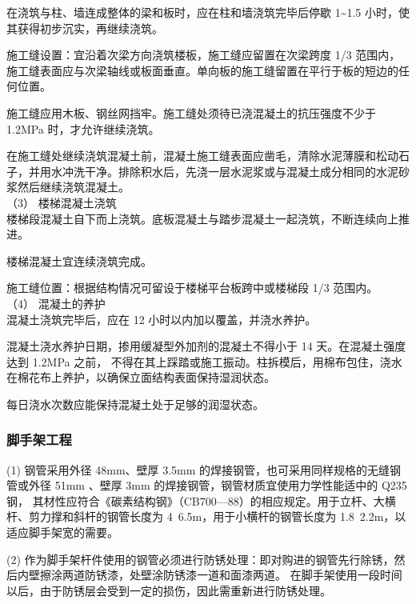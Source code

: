 在浇筑与柱、墙连成整体的梁和板时，应在柱和墙浇筑完毕后停歇 1\textasciitilde1.5 小时，使其获得初步沉实，再继续浇筑。

 施工缝设置：宜沿着次梁方向浇筑楼板，施工缝应留置在次梁跨度 1/3 范围内，施工缝表面应与次梁轴线或板面垂直。单向板的施工缝留置在平行于板的短边的任何位置。

 施工缝应用木板、钢丝网挡牢。施工缝处须待已浇混凝土的抗压强度不少于 1.2MPa 时，才允许继续浇筑。

 在施工缝处继续浇筑混凝土前，混凝土施工缝表面应凿毛，清除水泥薄膜和松动石子，并用水冲洗干净。排除积水后，先浇一层水泥浆或与混凝土成分相同的水泥砂浆然后继续浇筑混凝土。\\

（3） 楼梯混凝土浇筑\\

 楼梯段混凝土自下而上浇筑。底板混凝土与踏步混凝土一起浇筑，不断连续向上推进。

 楼梯混凝土宜连续浇筑完成。

 施工缝位置：根据结构情况可留设于楼梯平台板跨中或楼梯段 1/3 范围内。 \\

（4） 混凝土的养护\\

 混凝土浇筑完毕后，应在 12 小时以内加以覆盖，并浇水养护。

 混凝土浇水养护日期，掺用缓凝型外加剂的混凝土不得小于 14 天。在混凝土强度达到 1.2MPa 之前，
不得在其上踩踏或施工振动。柱拆模后，用棉布包住，浇水在棉花布上养护，以确保立面结构表面保持湿润状态。

 每日浇水次数应能保持混凝土处于足够的润湿状态。


\subsubsection{脚手架工程}

(1)  钢管采用外径 48mm、壁厚 3.5mm 的焊接钢管，也可采用同样规格的无缝钢管或外径 51mm 、壁厚 3mm 的焊接钢管，钢管材质宜使用力学性能适中的 Q235 钢，
其材性应符合《碳素结构钢》（CB700—88）的相应规定。用于立杆、大横杆、剪力撑和斜杆的钢管长度为 4~6.5m，用于小横杆的钢管长度为 1.8~2.2m，以适应脚手架宽的需要。

(2)  作为脚手架杆件使用的钢管必须进行防锈处理：即对购进的钢管先行除锈，然后内壁擦涂两道防锈漆，处壁涂防锈漆一道和面漆两道。
在脚手架使用一段时间以后，由于防锈层会受到一定的损伤，因此需重新进行防锈处理。

